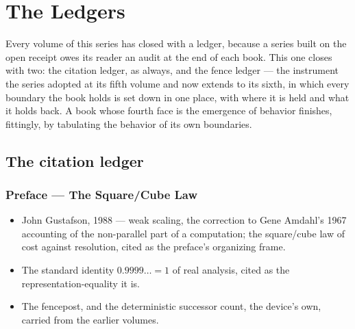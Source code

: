 \chapter{The Ledgers}

Every volume of this series has closed with a ledger, because a series built on
the open receipt owes its reader an audit at the end of each book. This one
closes with two: the citation ledger, as always, and the fence ledger --- the
instrument the series adopted at its fifth volume and now extends to its sixth,
in which every boundary the book holds is set down in one place, with where it is
held and what it holds back. A book whose fourth face is the emergence of behavior
finishes, fittingly, by tabulating the behavior of its own boundaries.

\section*{The citation ledger}

\subsection*{Preface --- The Square/Cube Law}
\begin{itemize}
\item John Gustafson, 1988 --- weak scaling, the correction to Gene Amdahl's
1967 accounting of the non-parallel part of a computation; the square/cube law
of cost against resolution, cited as the preface's organizing frame.
\item The standard identity $0.9999\ldots = 1$ of real analysis, cited as the
representation-equality it is.
\item The fencepost, and the deterministic successor count, the device's own,
carried from the earlier volumes.
\end{itemize}

